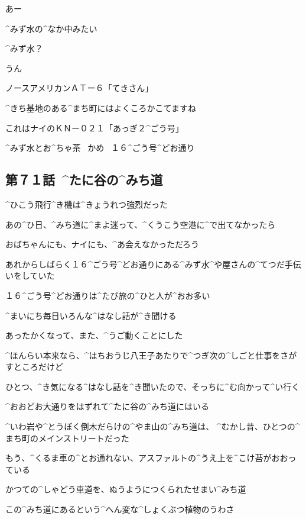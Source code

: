 \page
\Alpha あー

\Alpha ^{みず}{水}の^{なか}{中}みたい

\Nai ^{みず}{水}？

\Alpha うん

\page
\Sign ノースアメリカンＡＴー６「てきさん」

\Sign ^{きち}{基地}のある^{まち}{町}にはよくころかこてますね

\Sign これはナイのＫＮー０２１「あっぎ２^{ごう}{号}」

\page
\Sign ^{みず}{水}とお^{ちゃ}{茶}
\ かめ
\ １６^{ごう}{号}^{どお}{通}り


\subsection{第７１話\ ^{たに}{谷}の^{みち}{道}}

\page[78]
\Alpha ^{ひこう}{飛行}^{き}{機}は^{きょうれつ}{強烈}だった

\Alpha あの^{ひ}{日}、^{みち}{道}に^{まよ}{迷}って、^{くうこう}{空港}に^{で}{出}てなかったら

\Alpha おばちゃんにも、ナイにも、^{あ}{会}えなかっただろう

\page
\Alpha あれからしばらく１６^{ごう}{号}^{どお}{通}りにある^{みず}{水}^{や}{屋}さんの^{てつだ}{手伝}いをしていた

\Alpha １６^{ごう}{号}^{どお}{通}りは^{たび}{旅}の^{ひと}{人}が^{おお}{多}い

\Alpha ^{まいにち}{毎日}いろんな^{はなし}{話}が^{き}{聞}ける

\Alpha あったかくなって、また、^{うご}{動}くことにした

\Alpha ^{ほんらい}{本来}なら、^{はちおうじ}{八王子}あたりで^{つぎ}{次}の^{しごと}{仕事}をさがすところだけど

\Alpha ひとつ、^{き}{気}になる^{はなし}{話}を^{き}{聞}いたので、そっちに^{む}{向}かって^{い}{行}く

\page
\Alpha ^{おおどお}{大通}りをはずれて^{たに}{谷}の^{みち}{道}にはいる

\Alpha ^{いわ}{岩}や^{とうぼく}{倒木}だらけの^{やま}{山}の^{みち}{道}は、
^{むかし}{昔}、ひとつの^{まち}{町}のメインストリートだった

\Alpha もう、^{くるま}{車}の^{とお}{通}れない、アスファルトの^{うえ}{上}を^{こけ}{苔}がおおっている

\page
\Alpha かつての^{しゃどう}{車道}を、ぬうようにつくられたせまい^{みち}{道}

\Alpha この^{みち}{道}にあるという^{へん}{変}な^{しょくぶつ}{植物}のうわさ

